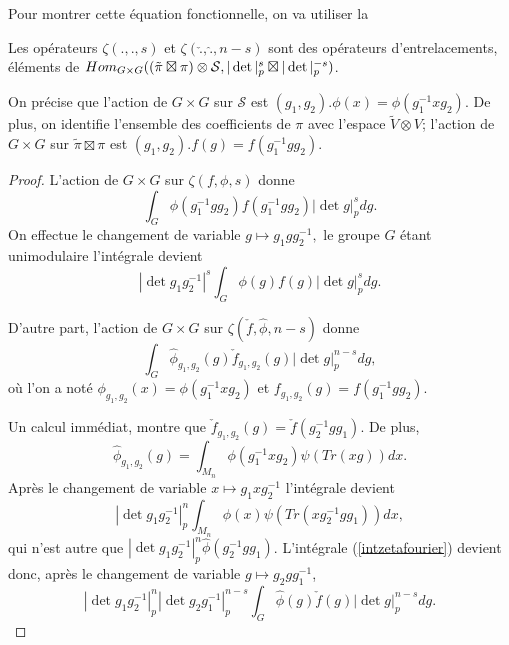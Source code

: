 Pour montrer cette équation fonctionnelle, on va utiliser la
\begin{propriete}
Les opérateurs $\zeta(., ., s)$ et $\zeta(\check{.}, \hat{.}, n-s)$ sont des opérateurs d'entrelacements, éléments de $\operatorname{\mathnormal{Hom}}_{G \times G} ( (\tilde{\pi} \boxtimes \pi) \otimes \mathcal{S}, |\det|_p^s \boxtimes |\det|_p^{-s})$.
\end{propriete}

On précise que l'action de $G \times G$ sur $\mathcal{S}$ est
$(g_1,g_2).\phi(x) = \phi(g_1^{-1} x g_2)$. De plus, on identifie l'ensemble des coefficients de $\pi$ avec l'espace $\tilde{V}\otimes V$; l'action de $G \times G$ sur $\tilde{\pi} \boxtimes \pi$ est $(g_1,g_2).f(g) = f(g_1^{-1} g g_2)$.

\begin{proof}
L'action de $G \times G$ sur $\zeta(f,\phi,s)$ donne
\begin{equation}
\int_G \phi(g_1^{-1}gg_2)f(g_1^{-1}gg_2)|\det g|_p^s dg.
\end{equation}
On effectue le changement de variable $g \mapsto g_1gg_2^{-1},$ le groupe $G$ étant unimodulaire l'intégrale devient
\begin{equation}
|\det g_1g_2^{-1}|^s\int_G \phi(g)f(g)|\det g|_p^s dg.
\end{equation}

D'autre part, l'action de $G \times G$ sur $\zeta(\check{f}, \hat{\phi}, n-s)$ donne
\begin{equation}
\label{intzetafourier}
\int_G \hat{\phi}_{g_1,g_2}(g)\check{f}_{g_1,g_2}(g)|\det g|_p^{n-s} dg,
\end{equation}
où l'on a noté $\phi_{g_1,g_2}(x) = \phi(g_1^{-1}xg_2)$ et $f_{g_1,g_2}(g) = f(g_1^{-1}gg_2).$

Un calcul immédiat, montre que $\check{f}_{g_1,g_2}(g) = \check{f}(g_2^{-1}gg_1)$. De plus,
\begin{equation}
\hat{\phi}_{g_1,g_2}(g) = \int_{M_n} \phi(g_1^{-1}xg_2) \psi(Tr(xg)) dx.
\end{equation}
Après le changement de variable $x \mapsto g_1xg_2^{-1}$ l'intégrale devient
\begin{equation}
|\det g_1g_2^{-1}|_p^n\int_{M_n} \phi(x) \psi(Tr(xg_2^{-1}gg_1)) dx,
\end{equation}
qui n'est autre que $|\det g_1g_2^{-1}|_p^n\hat{\phi}(g_2^{-1}gg_1)$.
L'intégrale (\ref{intzetafourier}) devient donc, après le changement de variable $g \mapsto g_2gg_1^{-1}$,
\begin{equation}|\det g_1g_2^{-1}|_p^n|\det g_2g_1^{-1}|_p^{n-s}\int_G \hat{\phi}(g)\check{f}(g)|\det g|_p^{n-s} dg.
\end{equation}
\end{proof}

